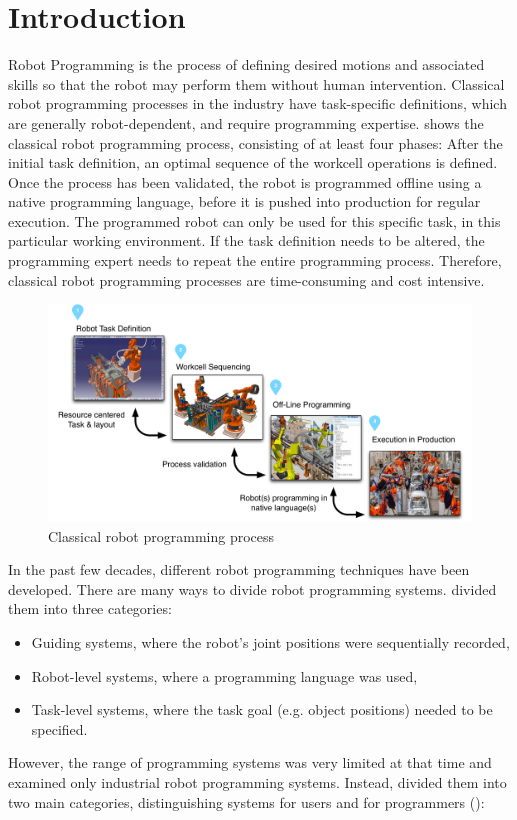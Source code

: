 \section{Introduction}
Robot Programming is the process of defining desired motions and associated skills so that the robot may perform them without human intervention.
Classical robot programming processes in the industry have task-specific definitions, which are generally robot-dependent, and require programming expertise.
 shows the classical robot programming process, consisting of at least four phases:
After the initial task definition, an optimal sequence of the workcell operations is defined.
Once the process has been validated, the robot is programmed offline using a native programming language, before it is pushed into production for regular execution.
The programmed robot can only be used for this specific task, in this particular working environment.
If the task definition needs to be altered, the programming expert needs to repeat the entire programming process.
Therefore, classical robot programming processes are time-consuming and cost intensive.

\begin{figure}[ht]
	\centering
	\includegraphics[width=\linewidth]{figures/manual-programming}
	\caption{Classical robot programming process}
	\label{fig:Classical robot programming process}
\end{figure}

In the past few decades, different robot programming techniques have been developed. 
There are many ways to divide robot programming systems. 
\cite{lozano1983robot} divided them into three categories: 
\begin{itemize}
	\item Guiding systems, where the robot's joint positions were sequentially recorded,
	\item Robot-level systems, where a programming language was used,
	\item Task-level systems, where the task goal (e.g. object positions) needed to be specified.
\end{itemize}
However, the range of programming systems was very limited at that time and examined only industrial robot programming systems.
Instead, \cite{Biggs2003} divided them into two main categories, distinguishing systems for users and for programmers ():

